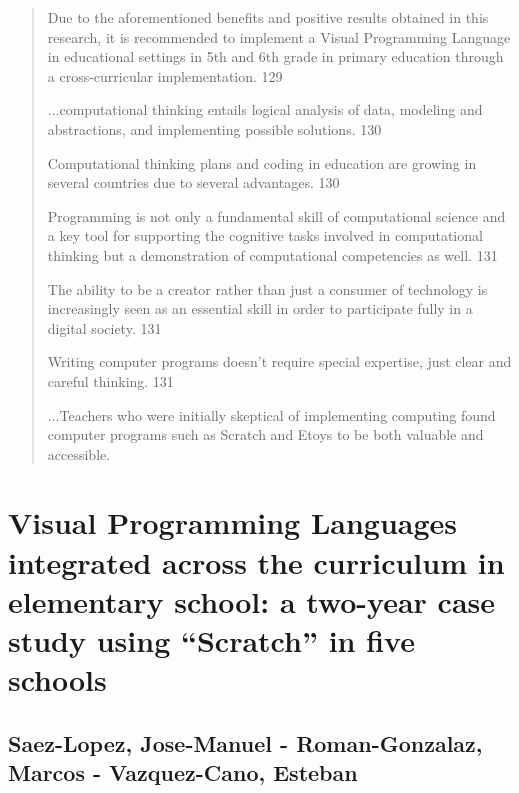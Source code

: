 \documentclass[12pt]{extarticle}
\begin{document}
{\begin{quote}
    
    Due to the aforementioned benefits and positive results obtained in this research, it is recommended to implement a Visual Programming Language in educational settings in 5th and 6th grade in primary education through a cross-curricular implementation. 	129
    
    ...computational thinking entails logical analysis of data, modeling and abstractions, and implementing possible solutions.	130
    
    Computational thinking plans and coding in education are growing in several countries due to several advantages. 130
    
    Programming is not only a fundamental skill of computational science and a key tool for supporting the cognitive tasks involved in computational thinking but a demonstration of computational competencies as well. 131
    
    The ability to be a creator rather than just a consumer of technology is increasingly seen as an essential skill in order to participate fully in a digital society. 131
    
    Writing computer programs doesn’t require special expertise, just clear and careful thinking. 131
    
    ...Teachers who were initially skeptical of implementing computing found computer programs such as Scratch and Etoys to be both valuable and accessible. 
\end{quote}

\section*{Visual Programming Languages integrated across the curriculum in elementary school: a two-year case study using “Scratch” in five schools}
\subsection*{Saez-Lopez, Jose-Manuel - Roman-Gonzalaz, Marcos - Vazquez-Cano, Esteban} 

}
\end{document}
